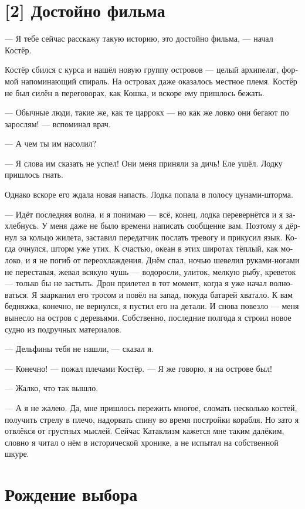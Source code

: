 \documentclass[a4paper,12pt,fleqn]{book}\usepackage{polyglossia}\setdefaultlanguage[babelshorthands=true]{russian}\setotherlanguage{english}\defaultfontfeatures{Ligatures=TeX,Mapping=tex-text}\usepackage{xcolor}\newcommand{\ml}[3]{#2}
\begin{document}
{\section{[2] Достойно фильма}

--- Я тебе сейчас расскажу такую историю, это достойно фильма, --- начал Костёр.

Костёр сбился с курса и нашёл новую группу островов --- целый архипелаг, формой напоминающий спираль.
На островах даже оказалось местное племя.
Костёр не был силён в переговорах, как Кошка, и вскоре ему пришлось бежать.

--- Обычные люди, такие же, как те царрокх --- но как же ловко они бегают по зарослям! --- вспоминал врач.

--- А чем ты им насолил?

--- Я слова им сказать не успел!
Они меня приняли за дичь!
Еле ушёл.
Лодку пришлось гнать.

Однако вскоре его ждала новая напасть.
Лодка попала в полосу цунами-шторма.

--- Идёт последняя волна, и я понимаю --- всё, конец, лодка перевернётся и я захлебнусь.
У меня даже не было времени написать сообщение вам.
Поэтому я дёрнул за кольцо жилета, заставил передатчик послать тревогу и прикусил язык.
Когда очнулся, шторм уже утих.
К счастью, океан в этих широтах тёплый, как молоко, и я не погиб от переохлаждения.
Днём спал, ночью шевелил руками-ногами не переставая, жевал всякую чушь --- водоросли, улиток, мелкую рыбу, креветок --- только бы не застыть.
Дрон прилетел в тот момент, когда я уже начал волноваться.
Я заарканил его тросом и повёл на запад, покуда батарей хватало.
К вам бедняжка, конечно, не вернулся, я пустил его на детали.
И снова повезло --- меня вынесло на остров с деревьями.
Собственно, последние полгода я строил новое судно из подручных материалов.

--- Дельфины тебя не нашли, --- сказал я.

--- Конечно! --- пожал плечами Костёр.
--- Я же говорю, я на острове был!

--- Жалко, что так вышло.

--- А я не жалею.
Да, мне пришлось пережить многое, сломать несколько костей, получить стрелу в плечо, надорвать спину во время постройки корабля.
Но зато я отвлёкся от грустных мыслей.
Сейчас Катаклизм кажется мне таким далёким, словно я читал о нём в исторической хронике, а не испытал на собственной шкуре.

\section{Рождение выбора}

}
\end{document}
